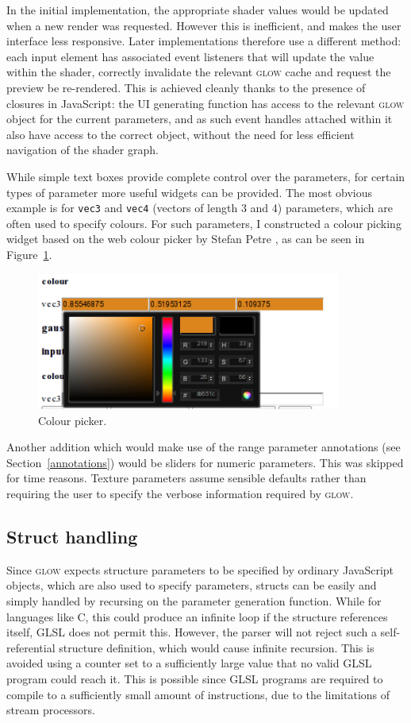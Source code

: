 \documentclass[12pt,twoside,notitlepage]{report}
\begin{document}
In the initial implementation, the appropriate shader values would be updated when a new render was requested. However this is inefficient, and makes the user interface less responsive. Later implementations therefore use a different method: each input element has associated event listeners that will update the value within the shader, correctly invalidate the relevant \textsc{glow} cache and request the preview be re-rendered. This is achieved cleanly thanks to the presence of closures in JavaScript: the UI generating function has access to the relevant \textsc{glow} object for the current parameters, and as such event handles attached within it also have access to the correct object, without the need for less efficient navigation of the shader graph. 

While simple text boxes provide complete control over the parameters, for certain types of parameter more useful widgets can be provided. The most obvious example is for \texttt{vec3} and \texttt{vec4} (vectors of length 3 and 4) parameters, which are often used to specify colours. For such parameters, I constructed a colour picking widget based on the web colour picker by Stefan Petre \citep{color}, as can be seen in Figure~\ref{colour}. 

\begin{figure}
\centering
\includegraphics[width=100mm]{colour.png}
\caption{Colour picker.\label{colour}}
\end{figure}

Another addition which would make use of the range parameter annotations (see Section~\ref{annotations}) would be sliders for numeric parameters. This was skipped for time reasons. Texture parameters assume sensible defaults rather than requiring the user to specify the verbose information required by \textsc{glow}. 

\subsection*{Struct handling}
Since \textsc{glow} expects structure parameters to be specified by ordinary JavaScript objects, which are also used to specify parameters, structs can be easily and simply handled by recursing on the parameter generation function. While for languages like C, this could produce an infinite loop if the structure references itself, GLSL does not permit this. However, the parser will not reject such a self-referential structure definition, which would cause infinite recursion. This is avoided using a counter set to a sufficiently large value that no valid GLSL program could reach it. This is possible since GLSL programs are required to compile to a sufficiently small amount of instructions, due to the limitations of stream processors.
\end{document}

